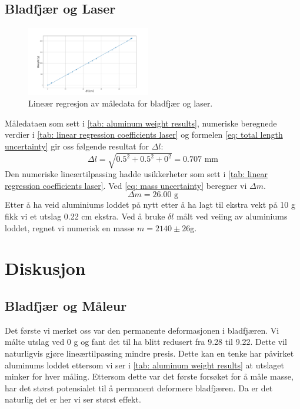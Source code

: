 \documentclass[reprint,norsk,notitlepage]{revtex4-2}
\begin{document}
\subsection{Bladfjær og Laser}
\begin{figure}[!ht]
  \centering
  \includegraphics[width = 0.48\textwidth]{fig/linreg_laser.pdf}
  \caption{Lineær regresjon av måledata for bladfjær og laser.}
  \label{fig: linreg laser}
\end{figure}
Måledataen som sett i \cref{tab: aluminum weight results}, numeriske beregnede verdier i \cref{tab: linear regression coefficients laser} og formelen \cref{eq: total length uncertainty} gir oss følgende resultat for $Δl$:
\begin{equation}\label{eq: total length uncertainty results laser}
  Δl = \sqrt{0.5^2 + 0.5^2 + 0^2} = 0.707 \text{ mm}  
\end{equation}
Den numeriske lineærtilpassing hadde usikkerheter som sett i \cref{tab: linear regression coefficients laser}. Ved \cref{eq: mass uncertainty} beregner vi $Δm$.
\begin{equation}\label{eq: total mass uncertainty results laser}
  Δm = 26.00 \text{ g}
\end{equation}
Etter å ha veid aluminiums loddet på nytt etter å ha lagt til ekstra vekt på 10 g fikk vi et utslag 0.22 cm ekstra. 
Ved å bruke $δl$ målt ved veiing av aluminiums loddet, regnet vi numerisk en masse $m = 2140 ±26 $g. 


\section{Diskusjon} \label{sec: discussion}
\subsection{Bladfjær og Måleur}
Det første vi merket oss var den permanente deformasjonen i bladfjæren. Vi målte utslag ved 0 g og fant det til ha blitt redusert fra 9.28 til 9.22. Dette vil naturligvis gjøre lineærtilpassing mindre presis. Dette kan en tenke har påvirket aluminums loddet ettersom vi ser i \cref{tab: aluminum weight results} at utslaget minker for hver måling. Ettersom dette var det første forsøket for å måle masse, har det størst potensialet til å permanent deformere bladfjæren. Da er det naturlig det er her vi ser størst effekt. 
\end{document}

